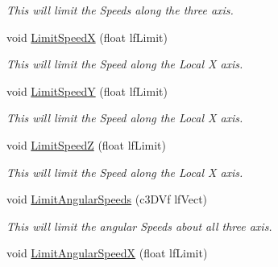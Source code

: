 \begin{DoxyCompactItemize}
\begin{DoxyCompactList}\small\item\em This will limit the Speeds along the three axis. \end{DoxyCompactList}\item 
\hypertarget{classc_momentum_a92874204b14a8fac3d5ad0267b18d3c4}{
void \hyperlink{classc_momentum_a92874204b14a8fac3d5ad0267b18d3c4}{LimitSpeedX} (float lfLimit)}
\label{classc_momentum_a92874204b14a8fac3d5ad0267b18d3c4}

\begin{DoxyCompactList}\small\item\em This will limit the Speed along the Local X axis. \end{DoxyCompactList}\item 
\hypertarget{classc_momentum_ab92115d594581e69de1b45aebec76442}{
void \hyperlink{classc_momentum_ab92115d594581e69de1b45aebec76442}{LimitSpeedY} (float lfLimit)}
\label{classc_momentum_ab92115d594581e69de1b45aebec76442}

\begin{DoxyCompactList}\small\item\em This will limit the Speed along the Local X axis. \end{DoxyCompactList}\item 
\hypertarget{classc_momentum_a58b3ec5a203e9913e968f4e745c65ac2}{
void \hyperlink{classc_momentum_a58b3ec5a203e9913e968f4e745c65ac2}{LimitSpeedZ} (float lfLimit)}
\label{classc_momentum_a58b3ec5a203e9913e968f4e745c65ac2}

\begin{DoxyCompactList}\small\item\em This will limit the Speed along the Local X axis. \end{DoxyCompactList}\item 
\hypertarget{classc_momentum_ab01fd3e19978ba13d4e28db1b0fa10fb}{
void \hyperlink{classc_momentum_ab01fd3e19978ba13d4e28db1b0fa10fb}{LimitAngularSpeeds} (c3DVf lfVect)}
\label{classc_momentum_ab01fd3e19978ba13d4e28db1b0fa10fb}

\begin{DoxyCompactList}\small\item\em This will limit the angular Speeds about all three axis. \end{DoxyCompactList}\item 
\hypertarget{classc_momentum_a0053ff7b3676c13a672d2e716920f4ed}{
void \hyperlink{classc_momentum_a0053ff7b3676c13a672d2e716920f4ed}{LimitAngularSpeedX} (float lfLimit)}
\label{classc_momentum_a0053ff7b3676c13a672d2e716920f4ed}


\end{DoxyCompactItemize}
